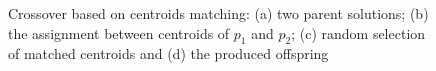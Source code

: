 
\begin{figure}[H]
\centering
{}
\caption{Crossover based on centroids matching: (a) two parent solutions; (b) the assignment between centroids of $p_1$ and $p_2$; (c) random selection of matched centroids and (d) the produced offspring}
\label{fig:crossover}
\end{figure}

